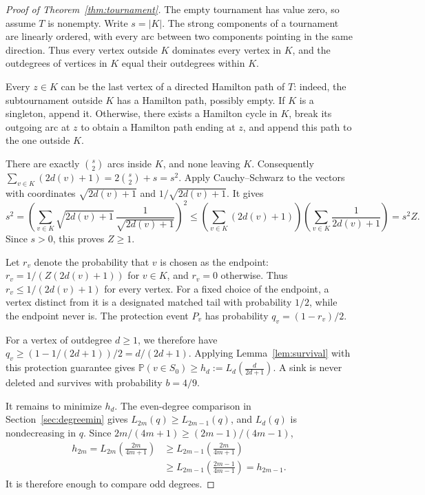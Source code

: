 \documentclass[10pt,a4paper]{article}
\newcommand{\Pp}{\mathbb P}
\newcommand{\abs}[1]{|#1|}
\begin{document}
\begin{proof}[Proof of Theorem~\ref{thm:tournament}]
The empty tournament has value zero, so assume \(T\) is nonempty. Write \(s=\abs K\). The strong components of a tournament are linearly ordered, with every arc between two components pointing in the same direction. Thus every vertex outside \(K\) dominates every vertex in \(K\), and the outdegrees of vertices in \(K\) equal their outdegrees within \(K\).

Every \(z\in K\) can be the last vertex of a directed Hamilton path of \(T\): indeed, the subtournament outside \(K\) has a Hamilton path, possibly empty. If \(K\) is a singleton, append it. Otherwise, there exists a Hamilton cycle in \(K\), break its outgoing arc at \(z\) to obtain a Hamilton path ending at \(z\), and append this path to the one outside \(K\).

There are exactly \(\binom{s}{2}\) arcs inside \(K\), and none leaving \(K\). Consequently \(\sum_{v\in K}(2d(v)+1)=2\binom{s}{2}+s=s^2\). Apply Cauchy--Schwarz to the vectors with coordinates \(\sqrt{2d(v)+1}\) and \(1/\sqrt{2d(v)+1}\). It gives
\[
s^2=\left(\sum_{v\in K}\sqrt{2d(v)+1}\,
\frac1{\sqrt{2d(v)+1}}\right)^2
\le\left(\sum_{v\in K}(2d(v)+1)\right)
\left(\sum_{v\in K}\frac1{2d(v)+1}\right)
=s^2Z.
\]
Since \(s>0\), this proves \(Z\ge1\).

Let \(r_v\) denote the probability that \(v\) is chosen as the endpoint: \(r_v=1/(Z(2d(v)+1))\) for \(v\in K\), and \(r_v=0\) otherwise. Thus \(r_v\le1/(2d(v)+1)\) for every vertex. For a fixed choice of the endpoint, a vertex distinct from it is a designated matched tail with probability \(1/2\), while the endpoint never is. The protection event \(P_v\) has probability \(q_v=(1-r_v)/2\).

For a vertex of outdegree \(d\ge1\), we therefore have
\(q_v\ge(1-1/(2d+1))/2=d/(2d+1)\).
Applying Lemma~\ref{lem:survival} with this protection guarantee gives \(\Pp(v\in S_0)\ge h_d:= L_d\left(\frac{d}{2d+1}\right) \). A sink is never deleted and survives with probability \(b=4/9\).

It remains to minimize \(h_d\). The even-degree comparison in Section~\ref{sec:degreemin} gives \(L_{2m}(q)\ge L_{2m-1}(q)\), and \(L_d(q)\) is nondecreasing in \(q\). Since \(2m/(4m+1)\ge(2m-1)/(4m-1)\),
\[
\begin{aligned}
h_{2m}=L_{2m}\left(\frac{2m}{4m+1}\right)
&\ge L_{2m-1}\left(\frac{2m}{4m+1}\right)\\
&\ge L_{2m-1}\left(\frac{2m-1}{4m-1}\right)=h_{2m-1}.
\end{aligned}
\]
It is therefore enough to compare odd degrees.


\end{proof}
\end{document}
